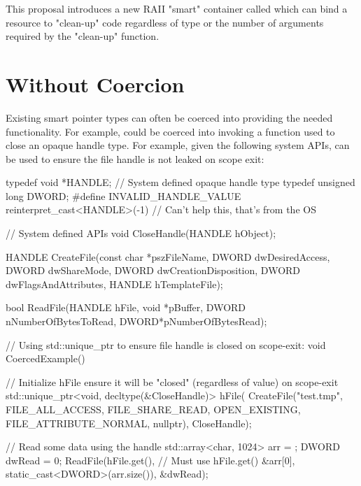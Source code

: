 \documentclass[ebook,11pt,article]{memoir}
\begin{document}
This proposal introduces a new RAII "smart" container called  which can bind a resource to "clean-up" code regardless of type or the number of arguments required by the "clean-up" function.

\section {Without Coercion}
Existing smart pointer types can often be coerced into providing the needed functionality.  For example,  could be coerced into invoking a function used to close an opaque handle type.  For example, given the following system APIs,  can be used to ensure the file handle is not leaked on scope exit:

\begin{codeblock}
typedef void *HANDLE;                // System defined opaque handle type
typedef unsigned long DWORD;
#define INVALID_HANDLE_VALUE reinterpret_cast<HANDLE>(-1)		// Can't help this, that's from the OS

// System defined APIs
void CloseHandle(HANDLE hObject);

HANDLE CreateFile(const char *pszFileName, 
	DWORD dwDesiredAccess, 
	DWORD dwShareMode, 
	DWORD dwCreationDisposition, 
	DWORD dwFlagsAndAttributes, 
	HANDLE hTemplateFile);

bool ReadFile(HANDLE hFile, 
	void *pBuffer, 
	DWORD nNumberOfBytesToRead, 
	DWORD*pNumberOfBytesRead);

// Using std::unique_ptr to ensure file handle is closed on scope-exit:
void CoercedExample()
{
	// Initialize hFile ensure it will be "closed" (regardless of value) on scope-exit
	std::unique_ptr<void, decltype(&CloseHandle)> hFile(
		CreateFile("test.tmp", 
			FILE_ALL_ACCESS, 
			FILE_SHARE_READ, 
			OPEN_EXISTING, 
			FILE_ATTRIBUTE_NORMAL,
			nullptr), 
		CloseHandle);

	// Read some data using the handle
	std::array<char, 1024> arr = { };
	DWORD dwRead = 0;
	ReadFile(hFile.get(),	// Must use hFile.get()
		&arr[0], 
		static_cast<DWORD>(arr.size()), 
		&dwRead);
}
\end{codeblock}
\end{document}
